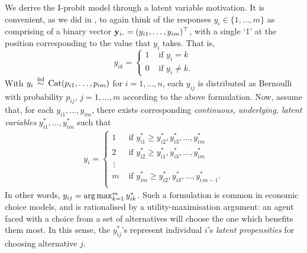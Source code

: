 We derive the I-probit model through a latent variable motivation.
It is convenient, as we did in , to again think of the responses $y_i \in \{1,\dots,m\} $ as comprising of a binary vector $\by_{i \bigcdot} = (y_{i1},\dots,y_{im})^\top$, with a single `1' at the position corresponding to the value that $y_i$ takes. 
That is,
\[
  y_{ik} =
  \begin{cases}
    1 &\text{ if } y_i = k \\
    0 &\text{ if } y_i \neq k.
  \end{cases}
\]
With $y_i\,\overset{\text{iid}}{\sim}\,\operatorname{Cat}(p_{i1},\dots,p_{im})$ for $i=1,\dots,n$, each $y_{ij}$ is distributed as Bernoulli with probability $p_{ij}$, $j=1,\dots,m$ according to the above formulation. 
Now, assume that, for each $y_{i1}, \dots, y_{im}$, there exists corresponding \emph{continuous, underlying, latent variables} $y_{i1}^*, \dots, y_{im}^*$ such that
\begin{align}\label{eq:latentmodel}
  y_i =
  \begin{cases}
    1 &\text{ if } y_{i1}^* \geq y_{i2}^*, y_{i3}^*, \dots, y_{im}^* \\
    2 &\text{ if } y_{i2}^* \geq y_{i1}^*, y_{i3}^*, \dots, y_{im}^* \\
    \,\vdots \\
    m &\text{ if } y_{im}^* \geq y_{i2}^*, y_{i3}^*, \dots, y_{i\,m-1}^*. \\
  \end{cases}  
\end{align}
In other words, 
$y_{ij} = \operatorname*{arg\,max}_{k=1}^m y_{ik}^*$.
Such a formulation is common in economic choice models, and is rationalised by a utility-maximisation argument: an agent faced with a choice from a set of alternatives will choose the one which benefits them most.
In this sense, the $y_{ij}^*$'s represent individual $i$'s \emph{latent propensities} for choosing alternative $j$.

